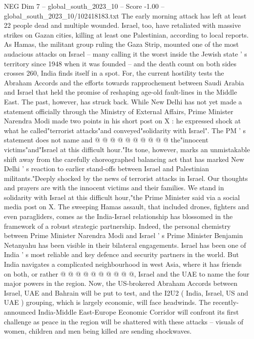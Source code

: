 \begin{textsample}{NEG Dim 7 – global\_south\_2023\_10 – Score -1.00 – global\_south\_2023\_10/102418183.txt}  \label{ex:f7_neg_069}
The early morning attack has left at least 22 people dead and multiple wounded.
Israel, too, have retaliated with massive strikes on Gazan cities, killing at least one Palestinian, according to local reports.
As Hamas, the militant group ruling the Gaza Strip, mounted one of the most audacious attacks on Israel -- many calling it the worst inside the Jewish state ' s territory since 1948 when it was founded -- and the death count on both sides crosses 260, India finds itself in a spot.
For, the current hostility tests the Abraham Accords and the efforts towards rapprochement between Saudi Arabia and Israel that held the promise of reshaping age-old fault-lines in the Middle East.
The past, however, has struck back.
While New Delhi has not yet made a statement officially through the Ministry of External Affairs, Prime Minister Narendra Modi made two points in his short post on X : he expressed shock at what he called"terrorist attacks"and conveyed"solidarity with Israel".
The PM ' s statement does not name and @ @ @ @ @ @ @ @ @ @ the"innocent victims"and"Israel at this difficult hour."Its tone, however, marks an unmistakable shift away from the carefully choreographed balancing act that has marked New Delhi ' s reaction to earlier stand-offs between Israel and Palestinian militants."Deeply shocked by the news of terrorist attacks in Israel.
Our thoughts and prayers are with the innocent victims and their families.
We stand in solidarity with Israel at this difficult hour,"the Prime Minister said via a social media post on X.
The sweeping Hamas assault, that included drones, fighters and even paragliders, comes as the India-Israel relationship has blossomed in the framework of a robust strategic partnership.
Indeed, the personal chemistry between Prime Minister Narendra Modi and Israel ' s Prime Minister Benjamin Netanyahu has been visible in their bilateral engagements.
Israel has been one of India ' s most reliable and key defence and security partners in the world.
But India navigates a complicated neighbourhood in west Asia, where it has friends on both, or rather @ @ @ @ @ @ @ @ @ @, Israel and the UAE to name the four major powers in the region.
Now, the US-brokered Abraham Accords between Israel, UAE and Bahrain will be put to test, and the I2U2 ( India, Israel, US and UAE ) grouping, which is largely economic, will face headwinds.
The recently-announced India-Middle East-Europe Economic Corridor will confront its first challenge as peace in the region will be shattered with these attacks -- visuals of women, children and men being killed are sending shockwaves.

\end{textsample}
